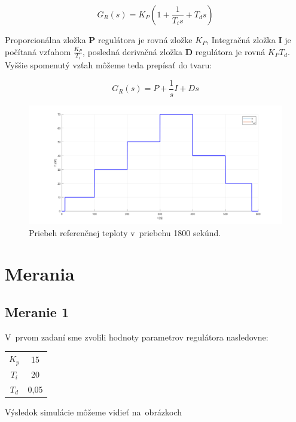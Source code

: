 \documentclass{article}
\begin{document}
$$ G_R(s) = K_P \left( 1 + \frac{1}{T_is} + T_ds \right) $$

Proporcionálna zložka \textbf{P} regulátora je rovná zložke $K_P$, Integračná zložka \textbf{I} je počítaná vzťahom
$\frac{K_P}{T_i}$, posledná derivačná zložka \textbf{D} regulátora je rovná $K_P T_d$.
Vyššie spomenutý vzťah môžeme teda prepísať do tvaru:

$$ G_R(s) = P  + \frac{1}{s}I + Ds $$

\begin{figure}[!htbp]
	\begin{center}
		\includegraphics[width=\textwidth]{./include/ziadana_hodnota.png}
		\caption{Priebeh referenčnej teploty v~priebehu 1800 sekúnd.}
		\label{fig:ziadanaHodnota}
	\end{center}
	\hfill
\end{figure}

\section{Merania}
\label{sec:merania}

\subsection{Meranie 1}
\label{sec:meranie1}

V~prvom zadaní sme zvolili hodnoty parametrov regulátora nasledovne:

\begin{center}
\begin{tabular}{ |c|c| }
 \hline
 $K_p$ & 15 \\
 $T_i$ & 20 \\
 $T_d$ & 0,05 \\
 \hline
\end{tabular}
\end{center}

Výsledok simulácie môžeme vidieť na~obrázkoch
\end{document}
